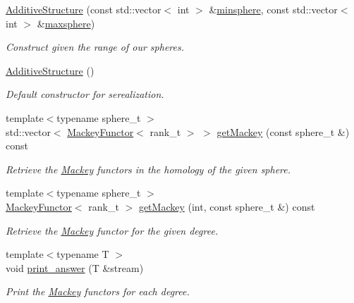 \begin{DoxyCompactItemize}
\item 
\hyperlink{classMackey_1_1AdditiveStructure_a6e6b98b9df433129320045abd5e50bab}{Additive\+Structure} (const std\+::vector$<$ int $>$ \&\hyperlink{classMackey_1_1AdditiveStructure_a1158af906d8bb5b9dcc7eed72367f25e}{minsphere}, const std\+::vector$<$ int $>$ \&\hyperlink{classMackey_1_1AdditiveStructure_a1d26ee2b19d9d66744ee4d79c302d9c4}{maxsphere})
\begin{DoxyCompactList}\small\item\em Construct given the range of our spheres. \end{DoxyCompactList}\item 
\hyperlink{classMackey_1_1AdditiveStructure_afd2b48da3942beba407b3add7ceb9b63}{Additive\+Structure} ()
\begin{DoxyCompactList}\small\item\em Default constructor for serealization. \end{DoxyCompactList}\item 
{\footnotesize template$<$typename sphere\+\_\+t $>$ }\\std\+::vector$<$ \hyperlink{classMackey_1_1MackeyFunctor}{Mackey\+Functor}$<$ rank\+\_\+t $>$ $>$ \hyperlink{classMackey_1_1AdditiveStructure_ad18c28b9da58ec8b1c1579ace5953177}{get\+Mackey} (const sphere\+\_\+t \&) const
\begin{DoxyCompactList}\small\item\em Retrieve the \hyperlink{namespaceMackey}{Mackey} functors in the homology of the given sphere. \end{DoxyCompactList}\item 
{\footnotesize template$<$typename sphere\+\_\+t $>$ }\\\hyperlink{classMackey_1_1MackeyFunctor}{Mackey\+Functor}$<$ rank\+\_\+t $>$ \hyperlink{classMackey_1_1AdditiveStructure_a2638212adc9b1fdacf0a50d9fb23cf0d}{get\+Mackey} (int, const sphere\+\_\+t \&) const
\begin{DoxyCompactList}\small\item\em Retrieve the \hyperlink{namespaceMackey}{Mackey} functor for the given degree. \end{DoxyCompactList}\item 
{\footnotesize template$<$typename T $>$ }\\void \hyperlink{classMackey_1_1AdditiveStructure_a2ab350a9e5187964b9cf42c3f36805fa}{print\+\_\+answer} (T \&stream)
\begin{DoxyCompactList}\small\item\em Print the \hyperlink{namespaceMackey}{Mackey} functors for each degree. \end{DoxyCompactList}\item 

\end{DoxyCompactItemize}

